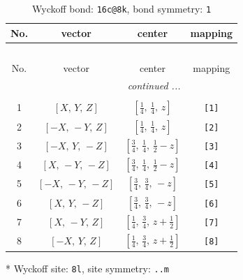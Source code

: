 \documentclass[fleqn,8pt]{jsarticle}
\begin{document}
\renewcommand{\arraystretch}{1.2}
\begin{longtable}{cccc}
\caption{Wyckoff bond: {\tt 16c@8k}, bond symmetry: {\tt 1}}
 \\
 \hline \hline
No. & vector & center & mapping \\ \hline \endfirsthead

\multicolumn{3}{l}{\tablename\ \thetable{}} \\
 \hline \hline
No. & vector & center & mapping \\ \hline \endhead

 \hline \hline
\multicolumn{3}{r}{\footnotesize\it continued ...} \\ \endfoot

 \hline \hline
\multicolumn{3}{r}{} \\ \endlastfoot

1 & $\left[ X,\, Y,\, Z \right]$ & $\left[ \frac{1}{4},\, \frac{1}{4},\, z \right]$ & {\tt [1]} \\ \hline
2 & $\left[ - X,\, - Y,\, Z \right]$ & $\left[ \frac{1}{4},\, \frac{1}{4},\, z \right]$ & {\tt [2]} \\ \hline
3 & $\left[ - X,\, Y,\, - Z \right]$ & $\left[ \frac{3}{4},\, \frac{1}{4},\, \frac{1}{2} - z \right]$ & {\tt [3]} \\ \hline
4 & $\left[ X,\, - Y,\, - Z \right]$ & $\left[ \frac{3}{4},\, \frac{1}{4},\, \frac{1}{2} - z \right]$ & {\tt [4]} \\ \hline
5 & $\left[ - X,\, - Y,\, - Z \right]$ & $\left[ \frac{3}{4},\, \frac{3}{4},\, - z \right]$ & {\tt [5]} \\ \hline
6 & $\left[ X,\, Y,\, - Z \right]$ & $\left[ \frac{3}{4},\, \frac{3}{4},\, - z \right]$ & {\tt [6]} \\ \hline
7 & $\left[ X,\, - Y,\, Z \right]$ & $\left[ \frac{1}{4},\, \frac{3}{4},\, z + \frac{1}{2} \right]$ & {\tt [7]} \\ \hline
8 & $\left[ - X,\, Y,\, Z \right]$ & $\left[ \frac{1}{4},\, \frac{3}{4},\, z + \frac{1}{2} \right]$ & {\tt [8]} \\
\end{longtable}
* Wyckoff site: {\tt 8l}, site symmetry: {\tt ..m}
\renewcommand{\arraystretch}{1.2}
\end{document}
